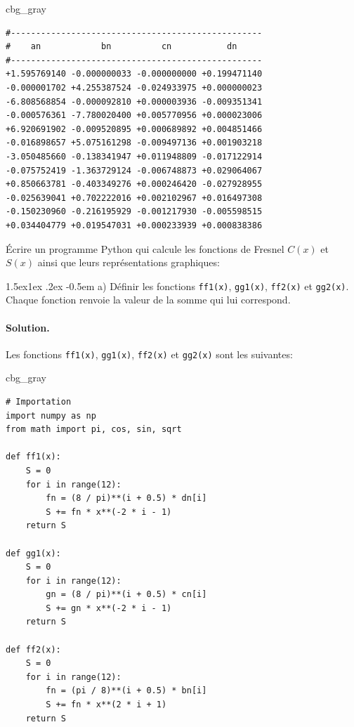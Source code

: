 \documentclass[%
oneside,                 %
final,                   %
10pt,french]{article}
\makeatletter
\newenvironment{_cod_tight}[1]{
   \def\FrameCommand{\colorbox{#1}}
   \FrameRule0.6pt\MakeFramed {\FrameRestore}\vskip3mm}
   {\vskip0mm\endMakeFramed}
\newenvironment{cod}[1]{
\bgroup\rmfamily
\fboxsep=0mm\relax
\begin{_cod_tight}{#1}
\list{}{\parsep=-2mm\parskip=0mm\topsep=0pt\leftmargin=2mm
\rightmargin=2\leftmargin\leftmargin=4pt\relax}
\item\relax}
{\endlist\end{_cod_tight}\egroup}
\newenvironment{doconceexercise}{}{}
\newcommand\subex{\@startsection{paragraph}{4}{\z@}%
                  {1.5ex\@plus1ex \@minus.2ex}%
                  {-0.5em}%
                  {\normalfont\normalsize\bfseries}}
\makeatother
\begin{document}
\begin{doconceexercise}
\begin{cod}{cbg_gray}\begin{verbatim}
#--------------------------------------------------
#    an            bn          cn           dn
#--------------------------------------------------
+1.595769140 -0.000000033 -0.000000000 +0.199471140
-0.000001702 +4.255387524 -0.024933975 +0.000000023
-6.808568854 -0.000092810 +0.000003936 -0.009351341
-0.000576361 -7.780020400 +0.005770956 +0.000023006
+6.920691902 -0.009520895 +0.000689892 +0.004851466
-0.016898657 +5.075161298 -0.009497136 +0.001903218
-3.050485660 -0.138341947 +0.011948809 -0.017122914
-0.075752419 -1.363729124 -0.006748873 +0.029064067
+0.850663781 -0.403349276 +0.000246420 -0.027928955
-0.025639041 +0.702222016 +0.002102967 +0.016497308
-0.150230960 -0.216195929 -0.001217930 -0.005598515
+0.034404779 +0.019547031 +0.000233939 +0.000838386
\end{verbatim}
\end{cod}
\noindent


Écrire un programme Python qui calcule les fonctions de Fresnel $C(x)$ et $S(x)$ ainsi que leurs représentations graphiques:


\subex{a)}
Définir les fonctions \texttt{ff1(x)}, \texttt{gg1(x)}, \texttt{ff2(x)} et \texttt{gg2(x)}. Chaque fonction renvoie la valeur de la somme qui lui correspond.


\paragraph{Solution.}
Les fonctions \texttt{ff1(x)}, \texttt{gg1(x)}, \texttt{ff2(x)} et \texttt{gg2(x)} sont les suivantes:
\begin{cod}{cbg_gray}\begin{verbatim}
# Importation
import numpy as np
from math import pi, cos, sin, sqrt

def ff1(x):
    S = 0
    for i in range(12):
        fn = (8 / pi)**(i + 0.5) * dn[i]
        S += fn * x**(-2 * i - 1)
    return S

def gg1(x):
    S = 0
    for i in range(12):
        gn = (8 / pi)**(i + 0.5) * cn[i]
        S += gn * x**(-2 * i - 1)
    return S

def ff2(x):
    S = 0
    for i in range(12):
        fn = (pi / 8)**(i + 0.5) * bn[i]
        S += fn * x**(2 * i + 1)
    return S


\end{verbatim}
\end{cod}
\end{doconceexercise}
\end{document}

